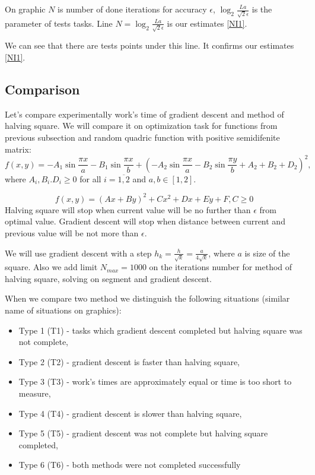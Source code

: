 \documentclass[12pt]{article}
\begin{document}
On graphic $N$ is number of done iterations for accuracy $\epsilon$, $\log_2\frac{La}{\sqrt{2}\epsilon}$ is the parameter of tests tasks. Line $N = \log_2\frac{La}{\sqrt{2}\epsilon}$ is our estimates \eqref{NI1}.

We can see that there are tests points under this line. It confirms our estimates \eqref{NI1}.

\subsection{Comparison}

Let's compare experimentally work's time of gradient descent and method of halving square. We will compare it on optimization task for functions from previous subsection and random quadric function with positive semidifenite matrix:
\begin{equation}\label{ex_1}
f(x,y) = -A_1\sin\frac{\pi x}{a} - B_1\sin\frac{\pi x}{b} + \left(-A_2\sin\frac{\pi x}{a} - B_2\sin\frac{\pi y}{b} + A_2 + B_2 + D_2\right)^2,
\end{equation}
where $A_i, B_i. D_i\geq 0$ for all $i = \overline{1, 2}$ and $a, b \in [1,2]$.

\begin{equation}\label{ex_2}
f(x,y) = (Ax + By)^2 + Cx^2 + Dx + Ey+ F, C\geq 0
\end{equation}
Halving square will stop when current value will be no further than $\epsilon$ from optimal value. Gradient descent will stop when distance between current and previous value will be not more than $\epsilon$.

We will use gradient descent with a step $h_k = \frac{h}{\sqrt{k}} = \frac{a}{4\sqrt{k}}$, where $a$ is size of the square. Also we add limit $N_{max} = 1000$ on the iterations number for method of halving square, solving on segment and gradient descent.

When we compare two method we distinguish the following situations (similar name of situations on graphics):

\begin{itemize}
\item Type 1 (T1) - tasks which gradient descent completed but halving square was not complete,
\item Type 2 (T2) - gradient descent is faster than halving square,
\item Type 3 (T3) - work's times are approximately equal or time is too short to measure,
\item Type 4 (T4) - gradient descent is slower than halving square,
\item Type 5 (T5) - gradient descent was not complete but halving square completed,
\item Type 6 (T6) - both methods were not completed successfully
\end{itemize}
\end{document}
